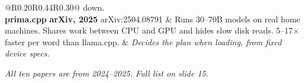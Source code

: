 \documentclass[aspectratio=169,11pt]{beamer}
\newcommand{\kefoot}[1]{%
  \vfill{\scriptsize\itshape\color{kemuted}#1}%
}
\newcommand{\kehead}[1]{{\bfseries\color{keink}#1}}
\newcommand{\kesub}[1]{{\footnotesize\color{kebody}#1}}
\newcommand{\kelim}[1]{{\scriptsize\itshape\color{keamber!75!black}#1}}
\begin{document}
\begin{frame}[shrink=20]
\begin{tabular}{@{}R{0.20\textwidth}R{0.44\textwidth}R{0.30\textwidth}@{}}
{      down.}\\[0.5em]
    \kehead{prima.cpp}\newline
      {\scriptsize\color{keteal}\bfseries arXiv, 2025}\newline
      {\tiny\ttfamily arXiv:2504.08791} &
      \kesub{Runs 30--70B models on real home machines. Shares work between
      CPU and GPU and hides slow disk reads. 5--17$\times$ faster per word than
      llama.cpp.} &
      \kelim{Decides the plan when loading, from fixed device specs.}\\
    \bottomrule
  \end{tabular}
  \kefoot{All ten papers are from 2024--2025. Full list on slide 15.}
\end{frame}

\end{document}
